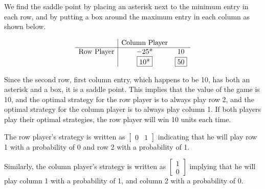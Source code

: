 \begin{solution}
    We find the saddle point by placing an asterisk next to the minimum entry in each row, and by putting a box around the maximum entry in each column as shown below.

    \[
        \begin{array}{c|cc}
                              & \text{Column Player} &           \\
            \hline
            \text{Row Player} & -25\text{*}          & 10        \\
                              & \fbox{10\text{*}}    & \fbox{50} \\
        \end{array}
    \]

    Since the second row, first column entry, which happens to be 10, has both an asterisk and a box, it is a saddle point. This implies that the value of the game is 10, and the optimal strategy for the row player is to always play row 2, and the optimal strategy for the column player is to always play column 1. If both players play their optimal strategies, the row player will win 10 units each time.

    The row player's strategy is written as $\begin{bmatrix} 0 & 1 \end{bmatrix}$ indicating that he will play row 1 with a probability of 0 and row 2 with a probability of 1.

    Similarly, the column player's strategy is written as $\begin{bmatrix} 1 \\ 0 \end{bmatrix}$ implying that he will play column 1 with a probability of 1, and column 2 with a probability of 0.
\end{solution}

